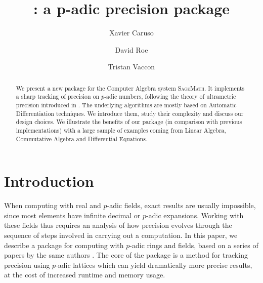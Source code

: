 \documentclass[sigconf]{acmart}
\newcommand{\sage}{\textsc{SageMath}\xspace}
\newcommand{\ZpL}{\text{\color{output} \rm \tt ZpL}\xspace}
\theoremstyle{definition}
\begin{document}
\title{\ZpL: a p-adic precision package}

\author{Xavier Caruso}
\author{David Roe}
\author{Tristan Vaccon}



\begin{abstract}
We present a new package \ZpL for the Computer Algebra system \sage. It 
implements a sharp tracking of precision on $p$-adic numbers, following 
the theory of ultrametric precision introduced in \cite{caruso-roe-vaccon:14a}. The 
underlying algorithms are mostly based on Automatic Differentiation 
techniques. We introduce them, study their complexity and discuss our 
design choices.
We illustrate the benefits of our package (in comparison with previous 
implementations) with a large sample of examples coming from Linear 
Algebra, Commutative Algebra and Differential Equations.
\end{abstract}

\maketitle

\section{Introduction}

When computing with real and $p$-adic fields, exact results are usually impossible, since most elements have infinite decimal or $p$-adic expansions.  Working with these fields thus requires an analysis of how precision evolves through the sequence of steps involved in carrying out a computation.  In this paper, we describe a package for computing with $p$-adic rings and fields, based on a series of papers by the same authors \cite{caruso-roe-vaccon:14a,caruso-roe-vaccon:15,caruso-roe-vaccon:16,caruso-roe-vaccon:17}.  The core of the package is a method for tracking precision using $p$-adic lattices which can yield dramatically more precise results, at the cost of increased runtime and memory usage.
\end{document}
